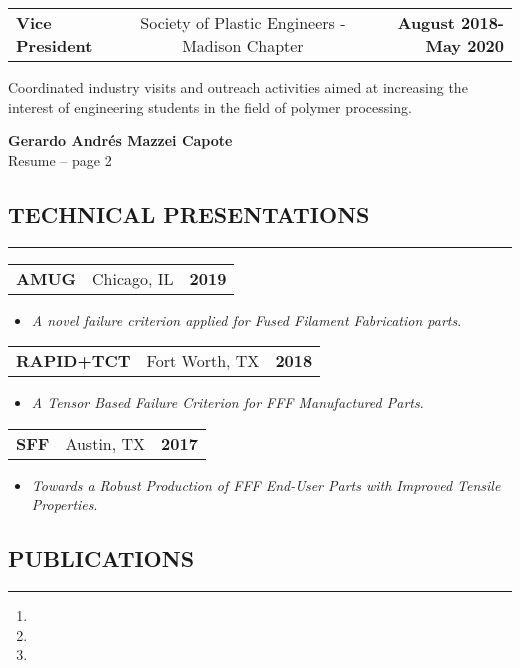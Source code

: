 \documentclass[11pt,letterpaper]{article}
\makeatletter
\newcommand{\headerrow}[3]
{\vspace{0.4em}
\noindent
\begin{tabular*}{\textwidth}{l @{\extracolsep{\fill}} cr}
	\textbf{#1} & %
	#2 &		  %
	\textbf{#3}\\ %
\end{tabular*}}
\makeatother
\begin{document}
	\headerrow
		{Vice President}
		{Society of Plastic Engineers - Madison Chapter} 
		{August 2018- May 2020}
		Coordinated industry visits and outreach activities aimed at increasing the interest of engineering students in the field of polymer processing.
	
\pagebreak %
\thispagestyle{empty} %

\begin{center}
	\LARGE \textbf{Gerardo Andrés Mazzei Capote} \\
	\normalsize Resume -- page 2
\end{center}

\subsection*{TECHNICAL PRESENTATIONS}

	\vspace{-0.5em}
	\hrule
	\headerrow
		{AMUG}
		{Chicago, IL}
		{2019}
	\begin{itemize}
		\item \emph{A novel failure criterion applied for Fused Filament Fabrication parts}.
	\end{itemize}

	\headerrow
		{RAPID+TCT}{Fort Worth, TX}{2018}
	\begin{itemize}
		\item \emph{A Tensor Based Failure Criterion for FFF Manufactured Parts}.
	\end{itemize}

	\headerrow
		{SFF}
		{Austin, TX}
		{2017}
	\begin{itemize}
		\item \emph{Towards a Robust Production of FFF End-User Parts with Improved Tensile Properties}. 
	\end{itemize}

\subsection*{PUBLICATIONS}
	\vspace{-0.5em}
	\hrule
	\vspace{0.6em}

\begin{enumerate}
	\item {}
	\item {}
	\item {}
\end{enumerate}
	
\end{document}
